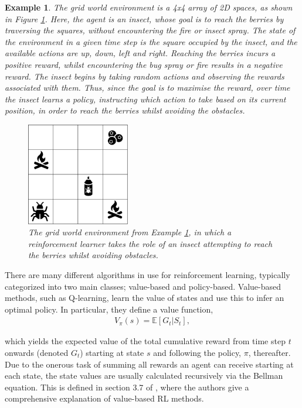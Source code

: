 \documentclass{article}
\newtheorem{example}[theorem]{Example}
\begin{document}
\begin{example}

The grid world environment is a 4x4 array of 2D spaces, as shown in Figure \ref{fig:Gridworld}. Here, the agent is an insect, whose goal is to reach the berries by traversing the squares, without encountering the fire or insect spray. The state of the environment in a given time step is the square occupied by the insect, and the available actions are up, down, left and right. Reaching the berries incurs a positive reward, whilst encountering the bug spray or fire results in a negative reward. The insect begins by taking random actions and observing the rewards associated with them. Thus, since the goal is to maximise the reward, over time the insect learns a policy, instructing which action to take based on its current position, in order to reach the berries whilst avoiding the obstacles. 

\label{ex:gridworld}
\begin{figure}[htp]
    \centering
    \includegraphics[width=0.4\textwidth]{Images/Gridworld.png}
    \caption{The grid world environment from Example \ref{ex:gridworld}, in which a reinforcement learner takes the role of an insect attempting to reach the berries whilst avoiding obstacles. }
    \label{fig:Gridworld}
\end{figure}

\end{example}

\noindent There are many different algorithms in use for reinforcement learning, typically categorized into two main classes; value-based and policy-based. Value-based methods, such as Q-learning, learn the value of states and use this to infer an optimal policy. In particular, they define a value function, 
\begin{align}
\label{eq: value function}
    V_{\pi}(s) = \mathbb{E}[G_t | S_t],
\end{align}

\noindent which yields the expected value of the total cumulative reward from time step $t$ onwards (denoted $G_t$) starting at state $s$ and following the policy, $\pi$, thereafter. Due to the onerous task of summing all rewards an agent can receive starting at each state, the state values are usually calculated recursively via the Bellman equation. This is defined in section 3.7 of \cite{sutton2018reinforcement}, where the authors give a comprehensive explanation of value-based RL methods.
\end{document}
